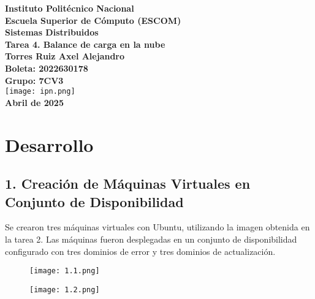 \documentclass[12pt]{article}
\begin{document}
\begin{titlepage}
    \centering
    {\large \textbf{Instituto Politécnico Nacional}}\\[0.3cm]
    {\large \textbf{Escuela Superior de Cómputo (ESCOM)}}\\[1.5cm]

    {\Huge \textbf{Sistemas Distribuidos}}\\[2cm]

    {\large \textbf{Tarea 4. Balance de carga en la nube}}\\[1.5cm]

    {\large \textbf{Torres Ruiz Axel Alejandro}}\\[0.3cm]
    {\large \textbf{Boleta: 2022630178}}\\[0.3cm]
    {\large \textbf{Grupo: 7CV3}}\\[3cm]

    \texttt{[image: ipn.png]} \\[2cm]

    {\large \textbf{Abril de 2025}}

    \vfill
\end{titlepage}
\newpage

\tableofcontents
\newpage

\section*{Desarrollo}

\subsection*{1. Creación de Máquinas Virtuales en Conjunto de Disponibilidad}
Se crearon tres máquinas virtuales con Ubuntu, utilizando la imagen obtenida en la tarea 2. Las máquinas fueron desplegadas en un conjunto de disponibilidad configurado con tres dominios de error y tres dominios de actualización.

\begin{figure}[H]
    \centering
    \texttt{[image: 1.1.png]}
\end{figure}

\begin{figure}[H]
    \centering
    \texttt{[image: 1.2.png]}
\end{figure}
\end{document}
